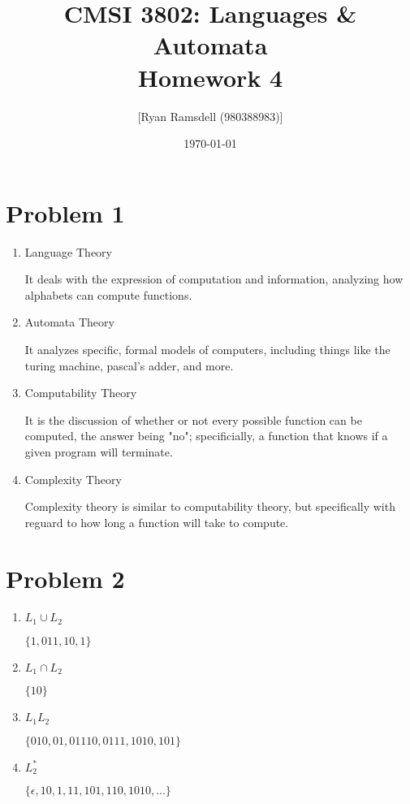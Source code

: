 \documentclass{article}
\title{CMSI 3802: Languages \& Automata \\ Homework 4}
\author{[Ryan Ramsdell (980388983)]}
\date{\today}
\begin{document}
\maketitle

\section*{Problem 1}
\begin{enumerate}[label=(\alph*)]
  \item Language Theory
    \begin{shaded}
      It deals with the expression of computation and information, analyzing how alphabets can compute functions.
    \end{shaded}
  \item Automata Theory
    \begin{shaded}
      It analyzes specific, formal models of computers, including things like the turing machine, pascal's adder, and more.
    \end{shaded}
  \item Computability Theory
    \begin{shaded}
      It is the discussion of whether or not every possible function can be computed, the answer being "no"; specificially, a function that knows if a given program will terminate.
    \end{shaded}
  \item Complexity Theory
    \begin{shaded}
      Complexity theory is similar to computability theory, but specifically with reguard to how long a function will take to compute.
    \end{shaded}
\end{enumerate}

\section*{Problem 2}
\begin{enumerate}[label=(\alph*)]
  \item $L_1 \cup L_2$
    \begin{shaded}
      $\{1, 011, 10, 1\}$
    \end{shaded}
  \item $L_1 \cap L_2$
    \begin{shaded}
      $\{10\}$
    \end{shaded}
  \item $L_1 L_2$
    \begin{shaded}
      $\{010, 01, 01110, 0111, 1010, 101\}$
    \end{shaded}
  \item $L_2^*$
    \begin{shaded}
      $\{\epsilon, 10, 1, 11, 101, 110, 1010, ...\}$
    \end{shaded}
\end{enumerate}
\end{document}
